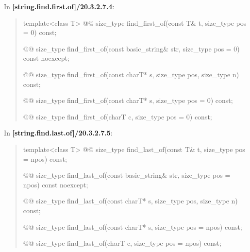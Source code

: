 \documentclass{wg21}
\begin{document}
In \textbf{[string.find.first.of]/20.3.2.7.4}:
\begin{quote}
\begin{itemdecl}
template<class T>
  @@ size_type find_first_of(const T& t, size_type pos = 0) const;
\end{itemdecl}

\begin{itemdecl}
@@ size_type find_first_of(const basic_string& str, size_type pos = 0) const noexcept;
\end{itemdecl}

\begin{itemdecl}
@@ size_type find_first_of(const charT* s, size_type pos, size_type n) const;
\end{itemdecl}

\begin{itemdecl}
@@ size_type find_first_of(const charT* s, size_type pos = 0) const;
\end{itemdecl}

\begin{itemdecl}
@@ size_type find_first_of(charT c, size_type pos = 0) const;
\end{itemdecl}
\end{quote}


In \textbf{[string.find.last.of]/20.3.2.7.5}:
\begin{quote}
\begin{itemdecl}
template<class T>
  @@ size_type find_last_of(const T& t, size_type pos = npos) const;
\end{itemdecl}

\begin{itemdecl}
@@ size_type find_last_of(const basic_string& str, size_type pos = npos) const noexcept;
\end{itemdecl}

\begin{itemdecl}
@@ size_type find_last_of(const charT* s, size_type pos, size_type n) const;
\end{itemdecl}

\begin{itemdecl}
@@ size_type find_last_of(const charT* s, size_type pos = npos) const;
\end{itemdecl}

\begin{itemdecl}
@@ size_type find_last_of(charT c, size_type pos = npos) const;
\end{itemdecl}
\end{quote}
\end{document}
